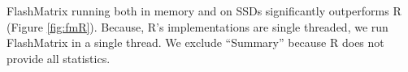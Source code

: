 FlashMatrix running both in memory and on SSDs significantly outperforms R
(Figure \ref{fig:fmR}).  Because, R's implementations are single threaded,
we run FlashMatrix in a single thread. 
We exclude ``Summary'' because R does not provide all statistics.

